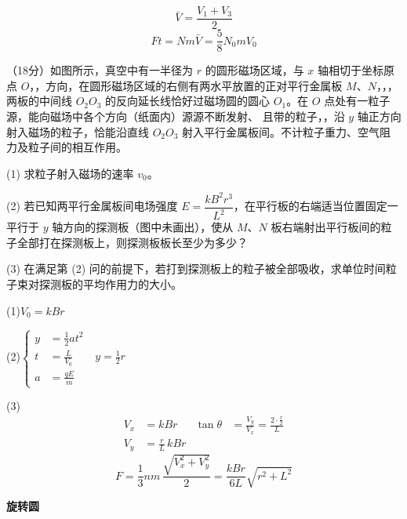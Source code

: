 \[ \bar V=\frac{V_1+V_3}{2} \]
\[ Ft=Nm\bar V=\frac58N_0mV_0 \]
\begin{problem}
（18分）如图所示，真空中有一半径为 $r$ 的圆形磁场区域，与 $x$ 轴相切于坐标原点 $O$，，方向，在圆形磁场区域的右侧有两水平放置的正对平行金属板 $M$、$N$，，，两板的中间线 $O_2O_3$ 的反向延长线恰好过磁场圆的圆心 $O_1$。在 $O$ 点处有一粒子源，能向磁场中各个方向（纸面内）源源不断发射、 且带的粒子，，沿 $y$ 轴正方向射入磁场的粒子，恰能沿直线 $O_2O_3$ 射入平行金属板间。不计粒子重力、空气阻力及粒子间的相互作用。

(1) 求粒子射入磁场的速率 $v_0$。

(2) 若已知两平行金属板间电场强度 $E=\dfrac{kB^2r^3}{L^2}$，在平行板的右端适当位置固定一平行于 $y$ 轴方向的探测板（图中未画出），使从 $M$、$N$ 板右端射出平行板间的粒子全部打在探测板上，则探测板板长至少为多少？

(3) 在满足第 (2) 问的前提下，若打到探测板上的粒子被全部吸收，求单位时间粒子束对探测板的平均作用力的大小。

\begin{solution}
(1)\quad $V_0=kBr$

(2)\quad $\left\{\begin{aligned} y&=\tfrac12at^2\\ t&=\tfrac{L}{V_0}\qquad y=\tfrac12r\\ a&=\tfrac{qE}{m}\end{aligned}\right.$

(3)
\begin{align*}
V_x&=kBr & \tan\theta&=\frac{V_y}{V_x}=\frac{2\cdot\frac{r}{2}}{L}\\
V_y&=\frac{r}{L}\,kBr
\end{align*}
\[ F=\frac13nm\,\frac{\sqrt{V_x^2+V_y^2}}{2}=\frac{kBr}{6L}\sqrt{r^2+L^2} \]
\end{solution}
\end{problem}
\textbf{旋转圆}

